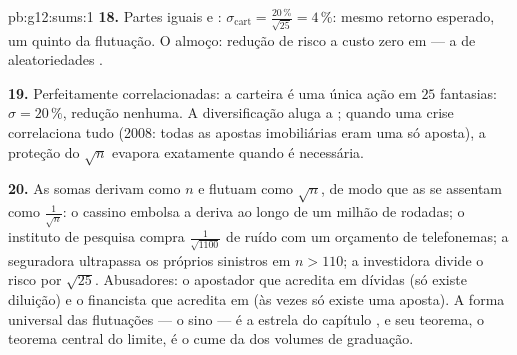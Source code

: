 \begin{solution}{pb:g12:sums:1}
\textbf{18.} Partes iguais e :
$\sigma_{\text{cart}} = \frac{20\,\%}{\sqrt{25}} = 4\,\%$:
mesmo retorno esperado, um quinto da flutuação. O almoço:
redução de risco a custo zero em  --- a  de
aleatoriedades .

\textbf{19.} Perfeitamente correlacionadas: a carteira é uma
única ação em $25$ fantasias: $\sigma = 20\,\%$, redução
nenhuma. A diversificação aluga a \emph{};
quando uma crise correlaciona tudo (2008: todas as apostas
imobiliárias eram uma só aposta), a proteção do $\sqrt n$
evapora exatamente quando é necessária.

\textbf{20.} As somas derivam como $n$ e flutuam como
$\sqrt n$, de modo que as  se assentam como
$\frac{1}{\sqrt n}$: o cassino embolsa a deriva ao longo de um
milhão de rodadas; o instituto de pesquisa compra
$\frac{1}{\sqrt{1100}}$ de ruído com um orçamento de
telefonemas; a seguradora ultrapassa os próprios sinistros em
$n > 110$; a investidora divide o risco por $\sqrt{25}$.
Abusadores: o apostador que acredita em dívidas (só existe
diluição) e o financista que acredita em  (às
vezes só existe uma aposta). A forma universal das flutuações
--- o sino --- é a estrela do capítulo , e seu
teorema, o teorema central do limite, é o cume da
 dos volumes de graduação.
\end{solution}
